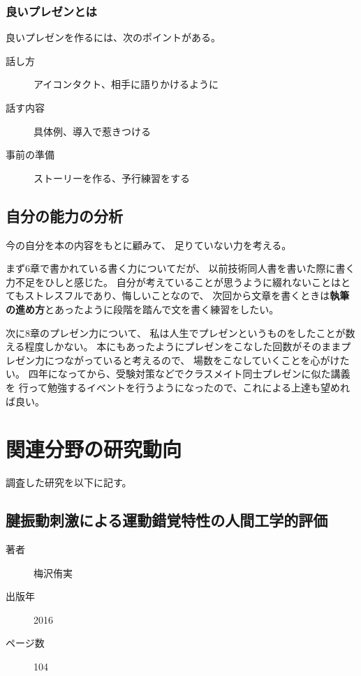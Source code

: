 \documentclass[]{jsarticle}
\begin{document}
        \subsubsection{良いプレゼンとは}
            良いプレゼンを作るには、次のポイントがある。

            \begin{description}
                \item[話し方] アイコンタクト、相手に語りかけるように
                \item[話す内容] 具体例、導入で惹きつける
                \item[事前の準備] ストーリーを作る、予行練習をする
            \end{description}

    \subsection{自分の能力の分析}
        今の自分を本の内容をもとに顧みて、
        足りていない力を考える。

        まず6章で書かれている書く力についてだが、
        以前技術同人書を書いた際に書く力不足をひしと感じた。
        自分が考えていることが思うように綴れないことはとてもストレスフルであり、悔しいことなので、
        次回から文章を書くときは{\bf 執筆の進め方}とあったように段階を踏んで文を書く練習をしたい。

        次に8章のプレゼン力について、
        私は人生でプレゼンというものをしたことが数える程度しかない。
        本にもあったようにプレゼンをこなした回数がそのままプレゼン力につながっていると考えるので、
        場数をこなしていくことを心がけたい。
        四年になってから、受験対策などでクラスメイト同士プレゼンに似た講義を
        行って勉強するイベントを行うようになったので、これによる上達も望めれば良い。
    
\section{関連分野の研究動向}
    調査した研究を以下に記す。

    \subsection{腱振動刺激による運動錯覚特性の人間工学的評価}
        \begin{description}
            \item[著者] 梅沢侑実
            \item[出版年] 2016
            \item[ページ数] 104
        \end{description}
\end{document}
